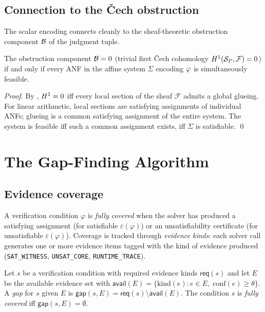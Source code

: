 \documentclass[11pt]{article}
\newcommand{\Enc}{\varepsilon}               %
\newcommand{\AffSys}{\Sigma}                 %
\newcommand{\Avail}{\mathsf{avail}}          %
\newcommand{\Req}{\mathsf{req}}              %
\newcommand{\Gap}{\mathsf{gap}}              %
\begin{document}
\subsection{Connection to the Čech obstruction}

The scalar encoding connects cleanly to the sheaf-theoretic
obstruction component $\mathcal{B}$ of the judgment tuple.

\begin{proposition}\label{prop:obstruction}
The obstruction component $\mathcal{B} = 0$ (trivial first Čech
cohomology $H^{1}(\mathcal{S}_P, \mathcal{F}) = 0$) if and only if
every ANF in the affine system $\AffSys$ encoding $\varphi$ is
simultaneously feasible.
\end{proposition}
\begin{proof}
By \cite{paper01}, $H^{1} = 0$ iff every local section of
the sheaf $\mathcal{F}$ admits a global glueing.
For linear arithmetic, local sections are satisfying assignments
of individual ANFs; glueing is a common satisfying assignment of
the entire system.
The system is feasible iff such a common assignment exists, \ie
iff $\AffSys$ is satisfiable.
\qed
\end{proof}

\section{The Gap-Finding Algorithm}\label{sec:gaps}

\subsection{Evidence coverage}

A verification condition $\varphi$ is \emph{fully covered} when
the solver has produced a satisfying assignment (for satisfiable
$\Enc(\varphi)$) or an unsatisfiability certificate (for
unsatisfiable $\Enc(\varphi)$).
Coverage is tracked through \emph{evidence kinds}: each solver
call generates one or more evidence items tagged with the kind
of evidence produced (\eg \texttt{SAT\_WITNESS},
\texttt{UNSAT\_CORE}, \texttt{RUNTIME\_TRACE}).

\begin{definition}[Gap]\label{def:gap}
Let $s$ be a verification condition with required evidence kinds
$\Req(s)$ and let $E$ be the available evidence set with
$\Avail(E) = \{\mathrm{kind}(e) : e \in E,\;
               \mathrm{conf}(e) \geq \theta\}$.
A \emph{gap} for $s$ given $E$ is
$\Gap(s, E) = \Req(s) \setminus \Avail(E)$.
The condition $s$ is \emph{fully covered} iff $\Gap(s, E) = \emptyset$.
\end{definition}
\end{document}
